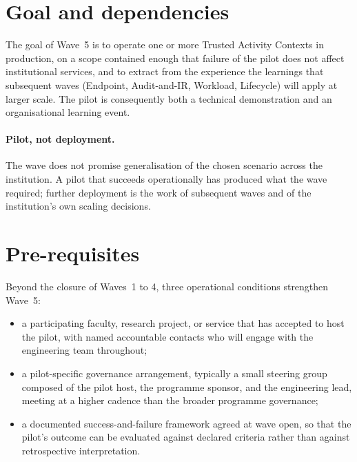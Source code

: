 \section{Goal and dependencies}
\label{sec:w5-goal}

The goal of Wave~5 is to operate one or more Trusted Activity
Contexts in production, on a scope contained enough that failure
of the pilot does not affect institutional services, and to
extract from the experience the learnings that subsequent waves
(Endpoint, Audit-and-IR, Workload, Lifecycle) will apply at
larger scale. The pilot is consequently both a technical
demonstration and an organisational learning event.

\paragraph{Pilot, not deployment.} The wave does not promise
generalisation of the chosen scenario across the institution. A
pilot that succeeds operationally has produced what the wave
required; further deployment is the work of subsequent waves and
of the institution's own scaling decisions.

\section{Pre-requisites}
\label{sec:w5-prereq}

Beyond the closure of Waves~1 to 4, three operational conditions
strengthen Wave~5:

\begin{itemize}[leftmargin=1.5em,nosep]
  \item a participating faculty, research project, or service that
    has accepted to host the pilot, with named accountable
    contacts who will engage with the engineering team
    throughout;
  \item a pilot-specific governance arrangement, typically a small
    steering group composed of the pilot host, the programme
    sponsor, and the engineering lead, meeting at a higher cadence
    than the broader programme governance;
  \item a documented success-and-failure framework agreed at wave
    open, so that the pilot's outcome can be evaluated against
    declared criteria rather than against retrospective
    interpretation.
\end{itemize}

